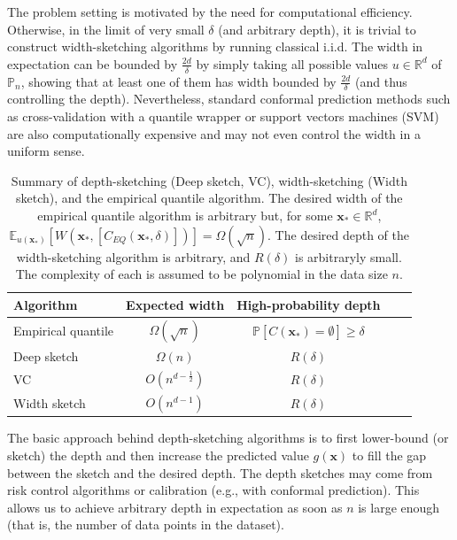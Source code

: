 The problem setting is motivated by the need for computational efficiency. Otherwise, in the limit of very small $\delta$ (and arbitrary depth), it is trivial to construct width-sketching algorithms by running classical i.i.d. 
The width in expectation can be bounded by $\frac{2d}{\delta}$ by simply taking all possible values $u \in \mathbb{R}^d$  of $\mathbb{P}_n$, showing that at least one of them has width bounded by $\frac{2d}{\delta}$ (and thus controlling the depth). Nevertheless,  standard conformal prediction methods such as cross-validation with a quantile wrapper \citep[see, e.g., ][]{papadopoulos2002inductive} or support vectors machines (SVM) \citep[see, e.g., ][]{shafer2008tutorial} are also computationally expensive and may not even control the width in a uniform sense.

\begin{table}
    \centering
    \begin{tabular}{|l|c|c|c|c|}
      \hline
      Algorithm & Expected width  & High-probability depth \\
      \hline\hline
      Empirical quantile & $\Omega(\sqrt{n})$ & $\mathbb{P}[C(\bm{x}_*) = \emptyset] \geq \delta$ \\
      \hline
      Deep sketch & $\Omega(n)$ &  $R(\delta)$ \\
      \hline
      VC & $O(n^{d-\frac{1}{2}})$ & $R(\delta)$ \\
      \hline
      Width sketch & $O(n^{d-1})$ & $R(\delta)$ \\
      \hline
    \end{tabular}
    \caption{Summary of depth-sketching (Deep sketch, VC), width-sketching (Width sketch), and the empirical quantile algorithm. The desired width of the empirical quantile algorithm is arbitrary but, for some $\bm{x}_* \in \mathbb{R}^d$, $\mathbb{E}_{u(\bm{x}_*)}\left[ W(\bm{x}_*,[C_{EQ}(\bm{x}_*, \delta)]) \right] = \Omega(\sqrt{n})$. The desired depth of the width-sketching algorithm is arbitrary, and $R(\delta)$ is arbitraryly small. The complexity of each is assumed to be polynomial in the data size $n$.}
    \label{tab:alg_summary}
\end{table}

The basic approach behind depth-sketching algorithms is to first lower-bound (or sketch) the depth and then increase the predicted value $g(\bm{x})$ to fill the gap between the sketch and the desired depth. The depth sketches may come from risk control algorithms or calibration (e.g., with conformal prediction). 
This allows us to achieve arbitrary depth in expectation as soon as $n$ is large enough (that is, the number of data points in the dataset). 

